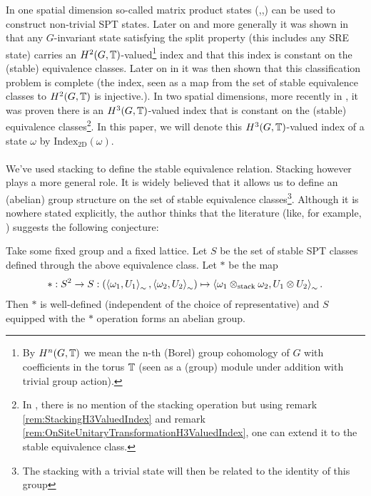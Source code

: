 \documentclass[11pt,a4paper,twoside]{article}
\numberwithin{equation}{section}
\begin{document}
	In one spatial dimension so-called matrix product states (\cite{Chen_2011},\cite{pollman2012symmetry},\cite{schuch2011MatrixProduct}) can be used to construct non-trivial SPT states. Later on and more generally it was shown in \cite{ogata2019classification} that any $G$-invariant state satisfying the split property (this includes any SRE state) carries an $H^2(G,\mathbb T)$-valued\footnote{By $H^n(G,\mathbb T)$ we mean the n-th (Borel) group cohomology of $G$ with coefficients in the torus $\mathbb T$ (seen as a (group) module under addition with trivial group action).} index and that this index is constant on the (stable) equivalence classes. Later on in \cite{kapustin2021classification} it was then shown that this classification problem is complete (the index, seen as a map from the set of stable equivalence classes to $H^2(G,\mathbb T)$ is injective.). In two spatial dimensions, more recently in \cite{ogata2021h3gmathbb}, it was proven there is an $H^3(G,\mathbb T)$-valued index that is constant on the (stable) equivalence classes\footnote{In \cite{ogata2021h3gmathbb}, there is no mention of the stacking operation but using remark \ref{rem:StackingH3ValuedIndex} and remark \ref{rem:OnSiteUnitaryTransformationH3ValuedIndex}, one can extend it to the stable equivalence class.}. In this paper, we will denote this $H^3(G,\mathbb T)$-valued index of a state $\omega$ by $\textrm{Index}_{\text{2D}}(\omega)$.
	\\\\
	We've used stacking to define the stable equivalence relation. Stacking however plays a more general role. It is widely believed that it allows us to define an (abelian) group structure on the set of stable equivalence classes\footnote{The stacking with a trivial state will then be related to the identity of this group}. Although it is nowhere stated explicitly, the author thinks that the literature (like, for example, \cite{kapustin2021classification}) suggests the following conjecture:
	\begin{conjecture}\label{conj:StableEquivGroupStructure}
		Take some fixed group and a fixed lattice. Let $S$ be the set of stable SPT classes defined through the above equivalence class. Let $*$ be the map
		\begin{equation}
			*:S^2\rightarrow S:(\expval{\omega_1,U_1}_{\sim},\expval{\omega_2,U_2}_{\sim})\mapsto \expval{\omega_1\otimes_\text{stack}\omega_2,U_1\otimes U_2}_{\sim}.
		\end{equation}
		Then $*$ is well-defined (independent of the choice of representative) and $S$ equipped with the $*$ operation forms an abelian group.
	\end{conjecture}
\end{document}
